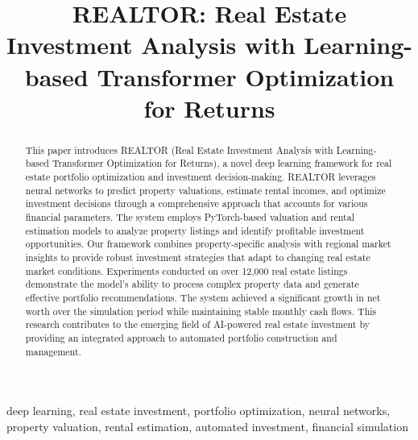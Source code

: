 \documentclass[conference]{IEEEtran}
\begin{document}
\title{REALTOR: Real Estate Investment Analysis with Learning-based Transformer Optimization for Returns}

\author{
\and
{}
}

\maketitle

\begin{abstract}
This paper introduces REALTOR (Real Estate Investment Analysis with Learning-based Transformer Optimization for Returns), a novel deep learning framework for real estate portfolio optimization and investment decision-making. REALTOR leverages neural networks to predict property valuations, estimate rental incomes, and optimize investment decisions through a comprehensive approach that accounts for various financial parameters. The system employs PyTorch-based valuation and rental estimation models to analyze property listings and identify profitable investment opportunities. Our framework combines property-specific analysis with regional market insights to provide robust investment strategies that adapt to changing real estate market conditions. Experiments conducted on over 12,000 real estate listings demonstrate the model's ability to process complex property data and generate effective portfolio recommendations. The system achieved a significant growth in net worth over the simulation period while maintaining stable monthly cash flows. This research contributes to the emerging field of AI-powered real estate investment by providing an integrated approach to automated portfolio construction and management.
\end{abstract}

\begin{IEEEkeywords}
deep learning, real estate investment, portfolio optimization, neural networks, property valuation, rental estimation, automated investment, financial simulation
\end{IEEEkeywords}
\end{document}
